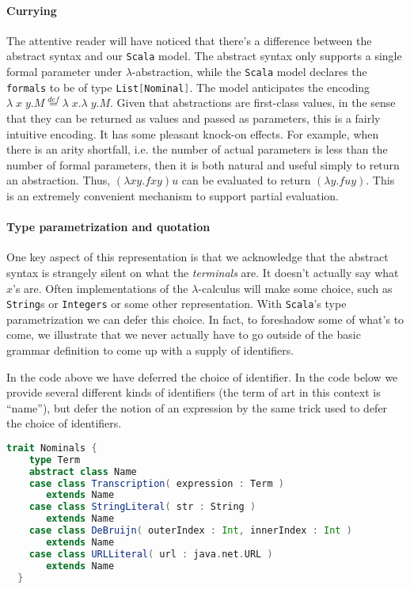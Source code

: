 \paragraph{Currying}
The attentive reader will have noticed that there's a difference
between the abstract syntax and our \texttt{Scala} model. The abstract
syntax only supports a single formal parameter under
$\lambda$-abstraction, while the \texttt{Scala} model declares the
\lstinline[language=Scala,mathescape=true]!formals! to be of type
\lstinline[language=Scala,mathescape=true]!List[Nominal]!. The model
anticipates the encoding $\lambda \; x \; y . M \stackrel{def}{=}
\lambda \; x. \lambda \; y . M$. Given that abstractions are
first-class values, in the sense that they can be returned as values
and passed as parameters, this is a fairly intuitive encoding. It has
some pleasant knock-on effects. For example, when there is an arity
shortfall, i.e. the number of actual parameters is less than the
number of formal parameters, then it is both natural and useful simply
to return an abstraction. Thus, $(\lambda x y. f x y)u$ can be
evaluated to return $(\lambda y. f u y)$. This is an extremely
convenient mechanism to support partial evaluation.

\paragraph{Type parametrization and quotation}
One key aspect of this representation is that we acknowledge that the
abstract syntax is strangely silent on what the \emph{terminals}
are. It doesn't actually say what $x$'s are. Often implementations of
the $\lambda$-calculus will make some choice, such as
\lstinline[language=Scala]!String!s or
\lstinline[language=Scala]!Integers! or some other
representation. With \texttt{Scala}'s type parametrization we can
defer this choice. In fact, to foreshadow some of what's to come, we
illustrate that we never actually have to go outside of the basic
grammar definition to come up with a supply of identifiers.

In the code above we have deferred the choice of identifier. In the
code below we provide several different kinds of identifiers (the term
of art in this context is ``name''), but defer the notion of an
expression by the same trick used to defer the choice of identifiers.

\begin{lstlisting}[language=Scala]
  trait Nominals {
    type Term
    abstract class Name
    case class Transcription( expression : Term )
       extends Name
    case class StringLiteral( str : String )
       extends Name
    case class DeBruijn( outerIndex : Int, innerIndex : Int )
       extends Name
    case class URLLiteral( url : java.net.URL )
       extends Name
  }
\end{lstlisting}

